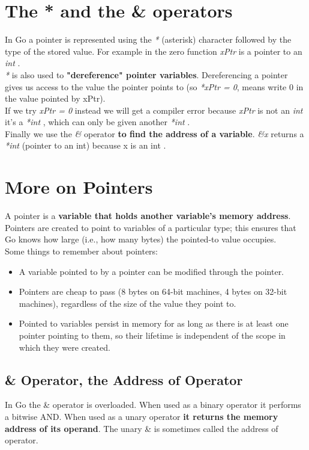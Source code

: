 \documentclass[10pt,letterpaper]{report}
\begin{document}
\section{The * and the \& operators}
In Go a pointer is represented using the \textit{*} (asterisk) character followed by the type of the stored value. For example in the zero function \textit{xPtr} is a pointer to an \textit{int} .\\
\textit{*} is also used to \textbf{"dereference" pointer variables}. Dereferencing a pointer gives us access to the value the pointer points to (so \textit{*xPtr = 0}, means write 0 in the value pointed by xPtr).\\
If we try \textit{xPtr = 0} instead we will get a compiler error because \textit{xPtr} is not an \textit{int} it's a \textit{*int} , which can only be given another \textit{*int} .\\
Finally we use the \textit{\&} operator \textbf{to find the address of a variable}. \textit{\&x} returns a \textit{*int} (pointer to an int) because x is an int .

\section{More on Pointers}
A pointer is a \textbf{variable that holds another variable's memory address}. Pointers are created to point to variables of a particular type; this ensures that Go knows how large (i.e., how many bytes) the pointed-to value occupies.\\
Some things to remember about pointers:
\begin{itemize}
\item A variable pointed to by a pointer can be modified through the pointer.
\item Pointers are cheap to pass (8 bytes on 64-bit machines, 4 bytes on 32-bit machines), regardless of the size of the value they point to.
\item Pointed to variables persist in memory for as long as there is at least one pointer pointing to them, so their lifetime is independent of the scope in which they were created.
\end{itemize}
\subsection{\& Operator, the Address of Operator}
In Go the \& operator is overloaded. When used as a binary operator it performs a bitwise AND. When used as a unary operator \textbf{it returns the memory address of its operand}. The unary \& is sometimes called the address of operator.
\end{document}
